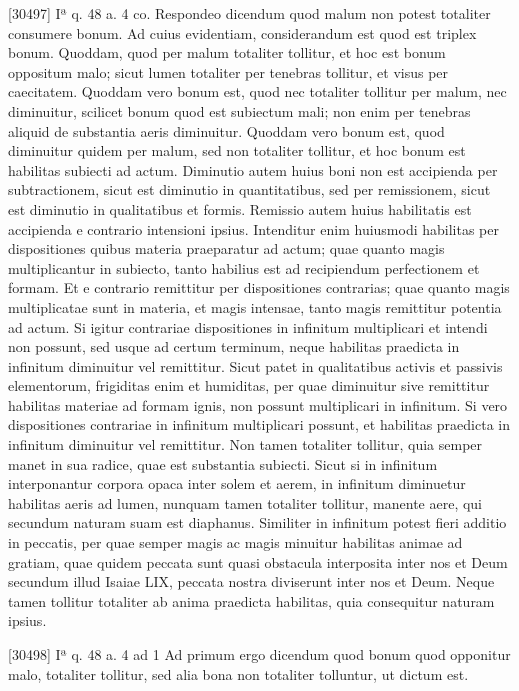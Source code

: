 \documentclass[paper=a4paper,fontsize=10pt,jafontsize=9pt,titlepage]{jlreq}
\begin{document}
[30497] Iª q. 48 a. 4 co. Respondeo dicendum quod malum non potest totaliter consumere bonum. Ad cuius evidentiam, considerandum est quod est triplex bonum. Quoddam, quod per malum totaliter tollitur, et hoc est bonum oppositum malo; sicut lumen totaliter per tenebras tollitur, et visus per caecitatem. Quoddam vero bonum est, quod nec totaliter tollitur per malum, nec diminuitur, scilicet bonum quod est subiectum mali; non enim per tenebras aliquid de substantia aeris diminuitur. Quoddam vero bonum est, quod diminuitur quidem per malum, sed non totaliter tollitur, et hoc bonum est habilitas subiecti ad actum. Diminutio autem huius boni non est accipienda per subtractionem, sicut est diminutio in quantitatibus, sed per remissionem, sicut est diminutio in qualitatibus et formis. Remissio autem huius habilitatis est accipienda e contrario intensioni ipsius. Intenditur enim huiusmodi habilitas per dispositiones quibus materia praeparatur ad actum; quae quanto magis multiplicantur in subiecto, tanto habilius est ad recipiendum perfectionem et formam. Et e contrario remittitur per dispositiones contrarias; quae quanto magis multiplicatae sunt in materia, et magis intensae, tanto magis remittitur potentia ad actum. Si igitur contrariae dispositiones in infinitum multiplicari et intendi non possunt, sed usque ad certum terminum, neque habilitas praedicta in infinitum diminuitur vel remittitur. Sicut patet in qualitatibus activis et passivis elementorum, frigiditas enim et humiditas, per quae diminuitur sive remittitur habilitas materiae ad formam ignis, non possunt multiplicari in infinitum. Si vero dispositiones contrariae in infinitum multiplicari possunt, et habilitas praedicta in infinitum diminuitur vel remittitur. Non tamen totaliter tollitur, quia semper manet in sua radice, quae est substantia subiecti. Sicut si in infinitum interponantur corpora opaca inter solem et aerem, in infinitum diminuetur habilitas aeris ad lumen, nunquam tamen totaliter tollitur, manente aere, qui secundum naturam suam est diaphanus. Similiter in infinitum potest fieri additio in peccatis, per quae semper magis ac magis minuitur habilitas animae ad gratiam, quae quidem peccata sunt quasi obstacula interposita inter nos et Deum secundum illud Isaiae LIX, peccata nostra diviserunt inter nos et Deum. Neque tamen tollitur totaliter ab anima praedicta habilitas, quia consequitur naturam ipsius.

[30498] Iª q. 48 a. 4 ad 1 Ad primum ergo dicendum quod bonum quod opponitur malo, totaliter tollitur, sed alia bona non totaliter tolluntur, ut dictum est.
\end{document}
